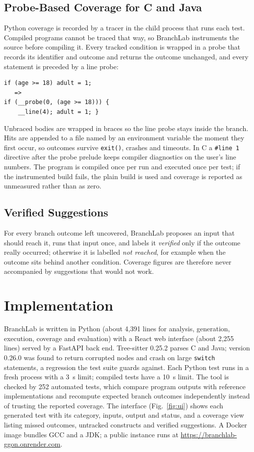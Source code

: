 \documentclass[conference]{IEEEtran}
\begin{document}
\subsection{Probe-Based Coverage for C and Java}
Python coverage is recorded by a tracer in the child process that runs each test. Compiled programs cannot be
traced that way, so BranchLab instruments the source before compiling it. Every tracked condition is wrapped in
a probe that records its identifier and outcome and returns the outcome unchanged, and every statement is
preceded by a line probe:
\begin{verbatim}
if (age >= 18) adult = 1;
   =>
if (__probe(0, (age >= 18))) {
    __line(4); adult = 1; }
\end{verbatim}
Unbraced bodies are wrapped in braces so the line probe stays inside the branch. Hits are appended to a file
named by an environment variable the moment they first occur, so outcomes survive \texttt{exit()}, crashes and
timeouts. In C a \texttt{\#line 1} directive after the probe prelude keeps compiler diagnostics on the user's
line numbers. The program is compiled once per run and executed once per test; if the instrumented build fails,
the plain build is used and coverage is reported as unmeasured rather than as zero.

\subsection{Verified Suggestions}
For every branch outcome left uncovered, BranchLab proposes an input that should reach it, runs that input once,
and labels it \emph{verified} only if the outcome really occurred; otherwise it is labelled \emph{not reached},
for example when the outcome sits behind another condition. Coverage figures are therefore never accompanied by
suggestions that would not work.

\section{Implementation}\label{sec:impl}
BranchLab is written in Python (about 4,391 lines for analysis, generation, execution, coverage and
evaluation) with a React web interface (about 2,255 lines) served by a FastAPI back end. Tree-sitter 0.25.2
parses C and Java; version 0.26.0 was found to return corrupted nodes and crash on large \texttt{switch}
statements, a regression the test suite guards against. Each Python test runs in a fresh process with a 3~s
limit; compiled tests have a 10~s limit. The tool is checked by 252 automated tests, which compare program
outputs with reference implementations and recompute expected branch outcomes independently instead of trusting
the reported coverage. The interface (Fig.~\ref{fig:ui}) shows each generated test with its category, inputs,
output and status, and a coverage view listing missed outcomes, untracked constructs and verified suggestions.
A Docker image bundles GCC and a JDK; a public instance runs at
\url{https://branchlab-ggon.onrender.com}.
\end{document}
